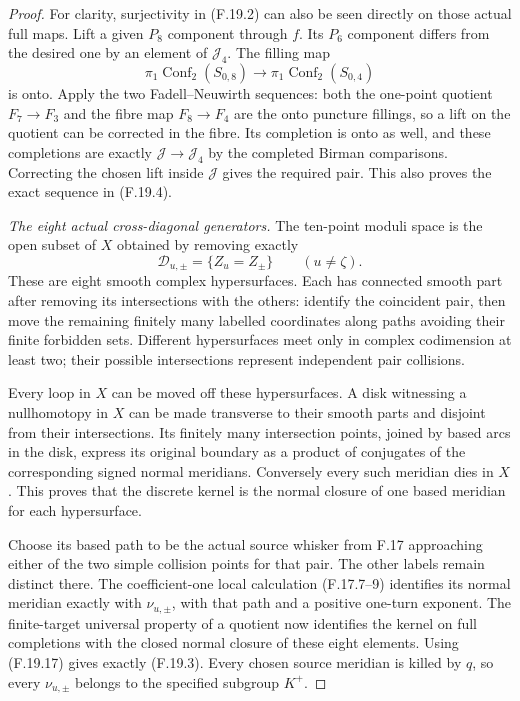 \begin{proof}
For clarity, surjectivity in (F.19.2) can also be
seen directly on those actual full maps.
Lift a given \(P_8\) component through \(f\).
Its \(P_6\) component differs from the desired one
by an element of \(\mathcal J_4\).
The filling map
\[
 \pi_1\operatorname{Conf}_2(S_{0,8})
                  \longrightarrow
       \pi_1\operatorname{Conf}_2(S_{0,4})
\]
is onto.  Apply the two Fadell--Neuwirth sequences:
both the one-point quotient \(F_7\to F_3\) and
the fibre map \(F_8\to F_4\) are the onto puncture
fillings, so a lift on the quotient can be corrected
in the fibre.
Its completion is onto as well, and these completions
are exactly \(\mathcal J\to\mathcal J_4\) by the
completed Birman comparisons.
Correcting the chosen lift inside \(\mathcal J\)
gives the required pair.
This also proves the exact sequence in (F.19.4).

\emph{The eight actual cross-diagonal generators.}
The ten-point moduli space is the open subset of
\(X\) obtained by removing exactly
\[
       \mathcal D_{u,\pm}=\{Z_u=Z_\pm\}\qquad(u\ne\zeta).
                                                               \tag{F.19.18}
\]
These are eight smooth complex hypersurfaces.
Each has connected smooth part after removing its
intersections with the others: identify the coincident
pair, then move the remaining finitely many labelled
coordinates along paths avoiding their finite forbidden
sets.
Different hypersurfaces meet only in complex codimension
at least two; their possible intersections represent
independent pair collisions.

Every loop in \(X\) can be moved off these hypersurfaces.
A disk witnessing a nullhomotopy in \(X\) can be made
transverse to their smooth parts and disjoint from
their intersections.  Its finitely many intersection
points, joined by based arcs in the disk, express
its original boundary as a product of conjugates
of the corresponding signed normal meridians.
Conversely every such meridian dies in \(X\).
This proves that the discrete kernel is the normal
closure of one based meridian for each hypersurface.

Choose its based path to be the actual source
whisker from F.17 approaching either of the two
simple collision points for that pair.
The other labels remain distinct there.
The coefficient-one local calculation (F.17.7--9)
identifies its normal meridian exactly with
\(\nu_{u,\pm}\), with that path and a positive
one-turn exponent.
The finite-target universal property of a quotient
now identifies the kernel on full completions
with the closed normal closure of these eight
elements.  Using (F.19.17) gives exactly (F.19.3).
Every chosen source meridian is killed by \(q\),
so every \(\nu_{u,\pm}\) belongs to the specified
subgroup \(K^+\).


\end{proof}
